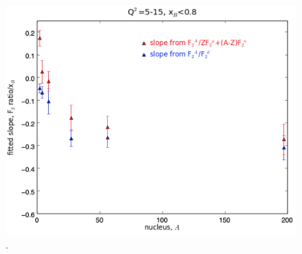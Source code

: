 \documentclass[oneside]{article}
\begin{document}
\begin{figure}[H]
\begin{minipage}{0.5\textwidth}
\includegraphics[width=\textwidth]{plots/plotsvA/Aslope_all.png}
\end{minipage}
  \caption[]{.}
  \label{fig:Aslope_summary}
\end{figure}   
\end{document}

